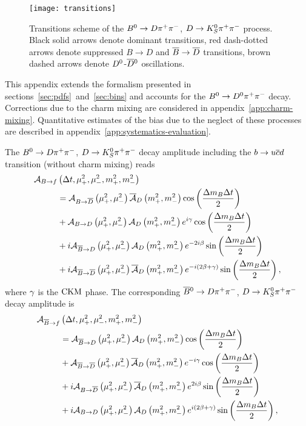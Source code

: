 \documentclass[a4paper,11pt]{article}
\begin{document}
\begin{figure}
\centering
  \texttt{[image: transitions]}
 \caption{Transitions scheme of the $\bdpp$, $\dkpp$ process. Black solid arrows
 denote dominant transitions, red dash-dotted arrows denote suppressed $B\to D$ and 
 $\bbar\to\dbar$ transitions, brown dashed arrows denote $\dn$-$\dnbar$ oscillations.}
 \label{fig:suppressed-transitions}
\end{figure}

This appendix extends the formalism presented in sections~\ref{sec:pdfs}~and~\ref{sec:bins}
and accounts for the $\bdnpp$ decay.  Corrections due to the charm mixing are 
considered in appendix~\ref{app:charm-mixing}.  Quantitative estimates of the bias 
due to the neglect of these processes are described in appendix~\ref{app:systematics-evaluation}.

The $\bn\to D\pi^+\pi^-$, $\dkpp$ decay amplitude including the $\btoucd$ transition 
(without charm mixing) reads
\begin{equation}\label{eq:decay_amp_scs}
\begin{split}
 \mca_{B\to f}&\dtbvardvar\\
 &= \abdbar\bvar \adbar\dvar \cos\hdmdt \\
 &+ \abd\bvar\ad\dvar e^{i\gphi} \cos\hdmdt \\
 &+ i\abbard\bvar \ad\dvar e^{-2i\pphi} \sin\hdmdt \\
 &+ i\abbardbar\bvar \adbar\dvar e^{-i\lbr2\pphi + \gphi\rbr} \sin\hdmdt,
\end{split}
\end{equation}
where $\gphi$ is the $\ckm$ phase.  The corresponding 
$\bnbar\to D\pi^+\pi^-$, $\dkpp$ decay amplitude is
\begin{equation}\label{eq:decay_bar_amp_scs}
\begin{split}
 \mca_{\bbar\to f}&\dtbvardvar\\
 &=  \abbard   \bvar \ad   \dvar \cos\hdmdt \\
 &+  \abbardbar\bvar \adbar\dvar e^{-i\gphi} \cos\hdmdt \\
 &+ i\abdbar   \bvar \adbar\dvar e^{2i\pphi} \sin\hdmdt \\
 &+ i\abd      \bvar \ad   \dvar e^{i\lbr2\pphi + \gphi\rbr} \sin\hdmdt,
\end{split}
\end{equation}
\end{document}
